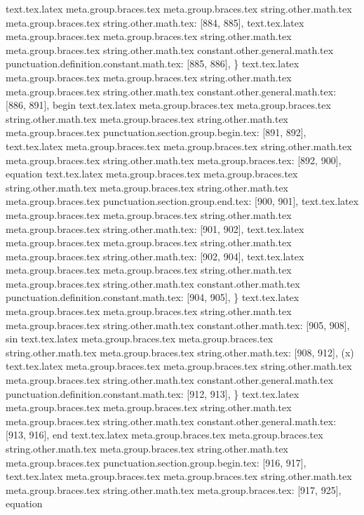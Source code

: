{{{{{{{{{{{{{{{{{{{{{{{{{{text.tex.latex meta.group.braces.tex meta.group.braces.tex string.other.math.tex meta.group.braces.tex string.other.math.tex: [884, 885], {
}
text.tex.latex meta.group.braces.tex meta.group.braces.tex string.other.math.tex meta.group.braces.tex string.other.math.tex constant.other.general.math.tex punctuation.definition.constant.math.tex: [885, 886], {\}
text.tex.latex meta.group.braces.tex meta.group.braces.tex string.other.math.tex meta.group.braces.tex string.other.math.tex constant.other.general.math.tex: [886, 891], {begin}
text.tex.latex meta.group.braces.tex meta.group.braces.tex string.other.math.tex meta.group.braces.tex string.other.math.tex meta.group.braces.tex punctuation.section.group.begin.tex: [891, 892], {{}
text.tex.latex meta.group.braces.tex meta.group.braces.tex string.other.math.tex meta.group.braces.tex string.other.math.tex meta.group.braces.tex: [892, 900], {equation}
text.tex.latex meta.group.braces.tex meta.group.braces.tex string.other.math.tex meta.group.braces.tex string.other.math.tex meta.group.braces.tex punctuation.section.group.end.tex: [900, 901], {}}
text.tex.latex meta.group.braces.tex meta.group.braces.tex string.other.math.tex meta.group.braces.tex string.other.math.tex: [901, 902], {
}
text.tex.latex meta.group.braces.tex meta.group.braces.tex string.other.math.tex meta.group.braces.tex string.other.math.tex: [902, 904], {  }
text.tex.latex meta.group.braces.tex meta.group.braces.tex string.other.math.tex meta.group.braces.tex string.other.math.tex constant.other.math.tex punctuation.definition.constant.math.tex: [904, 905], {\}
text.tex.latex meta.group.braces.tex meta.group.braces.tex string.other.math.tex meta.group.braces.tex string.other.math.tex constant.other.math.tex: [905, 908], {sin}
text.tex.latex meta.group.braces.tex meta.group.braces.tex string.other.math.tex meta.group.braces.tex string.other.math.tex: [908, 912], {(x)
}
text.tex.latex meta.group.braces.tex meta.group.braces.tex string.other.math.tex meta.group.braces.tex string.other.math.tex constant.other.general.math.tex punctuation.definition.constant.math.tex: [912, 913], {\}
text.tex.latex meta.group.braces.tex meta.group.braces.tex string.other.math.tex meta.group.braces.tex string.other.math.tex constant.other.general.math.tex: [913, 916], {end}
text.tex.latex meta.group.braces.tex meta.group.braces.tex string.other.math.tex meta.group.braces.tex string.other.math.tex meta.group.braces.tex punctuation.section.group.begin.tex: [916, 917], {{}
text.tex.latex meta.group.braces.tex meta.group.braces.tex string.other.math.tex meta.group.braces.tex string.other.math.tex meta.group.braces.tex: [917, 925], {equation}
}}}}}}}}}}}}}}}}}}}}}}}}}}}}}}
